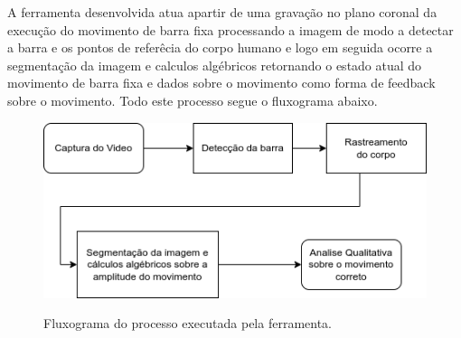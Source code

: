  A ferramenta desenvolvida atua apartir de uma gravação no plano coronal da execução do movimento de barra fixa processando a imagem de modo a detectar a barra e os pontos de referêcia do corpo humano e logo em seguida ocorre a segmentação da imagem e calculos algébricos retornando o estado atual do movimento de barra fixa e dados sobre o movimento como forma de feedback sobre o movimento. Todo este processo segue o fluxograma abaixo.

\begin{figure}[!htb]
	\centering
  \caption{Fluxograma do processo executada pela ferramenta.}
	\includegraphics[scale=0.7]{figuras/diagrama/processo.png}
	\label{fig:fluxo}
\end{figure}





